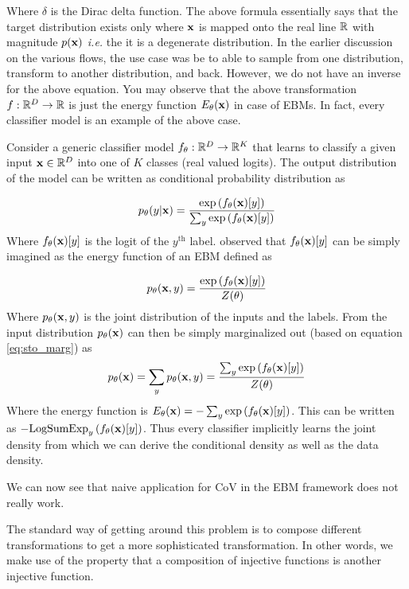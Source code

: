 \documentclass[a4paper, 11pt]{article}
\begin{document}
Where $\delta$ is the Dirac delta function. The above formula essentially says that the target distribution exists only where $\mbox{$\mbox{$\mathbf{x}$}$}$ is mapped onto the real line $\mathbb{R}$ with magnitude $p(\mbox{$\mbox{$\mathbf{x}$}$})$ \textit{i.e.} the it is a degenerate distribution. In the earlier discussion on the various flows, the use case was be to able to sample from one distribution, transform to another distribution, and back. However, we do not have an inverse for the above equation.
You may observe that the above transformation $f: \mathbb{R}^D \to \mathbb{R}$ is just the energy function $E_\theta(\mbox{$\mbox{$\mathbf{x}$}$})$ in case of EBMs. In fact, every classifier model is an example of the above case.

Consider a generic classifier model $f_\theta: \mathbb{R}^D \to \mathbb{R}^K$ that learns to classify a given input $\mbox{$\mbox{$\mathbf{x}$}$} \in \mathbb{R}^D$ into one of $K$ classes (real valued logits). The output distribution of the model can be written as conditional probability distribution as

\begin{align}
    p_\theta(y | \mbox{$\mbox{$\mathbf{x}$}$}) = \frac{\exp\left (f_\theta(\mbox{$\mbox{$\mathbf{x}$}$})[y]  \right )}{\sum_y \exp\left (f_\theta(\mbox{$\mbox{$\mathbf{x}$}$})[y]  \right )}
\end{align}
Where $f_\theta(\mbox{$\mbox{$\mathbf{x}$}$})[y]$ is the logit of the $y^{\text{th}}$ label. \cite{grathwohl2019your} observed that $f_\theta(\mbox{$\mbox{$\mathbf{x}$}$})[y]$ can be simply imagined as the energy function of an EBM defined as

\begin{align}
    p_\theta(\mbox{$\mbox{$\mathbf{x}$}$} , y) = \frac{\exp\left (f_\theta(\mbox{$\mbox{$\mathbf{x}$}$})[y]  \right )}{Z(\theta)}
\end{align}
Where $p_\theta(\mbox{$\mbox{$\mathbf{x}$}$} , y)$ is the joint distribution of the inputs and the labels. From the input distribution $p_\theta(\mbox{$\mbox{$\mathbf{x}$}$})$ can then be simply marginalized out (based on equation \eqref{eq:sto_marg}) as
\begin{align}
    p_\theta(\mbox{$\mbox{$\mathbf{x}$}$}) = \sum_y p_\theta(\mbox{$\mbox{$\mathbf{x}$}$} , y) = \frac{\sum_y\exp\left (f_\theta(\mbox{$\mbox{$\mathbf{x}$}$})[y]  \right )}{Z(\theta)}
\end{align}
Where the energy function is $E_\theta(\mbox{$\mbox{$\mathbf{x}$}$}) = - \sum_y\exp\left (f_\theta(\mbox{$\mbox{$\mathbf{x}$}$})[y]  \right )$. This can be written as $-\text{LogSumExp}_y \left (f_\theta(\mbox{$\mbox{$\mathbf{x}$}$})[y]  \right )$. Thus every classifier implicitly learns  the joint density from which we can derive the conditional density as well as the data density.

We can now see that naive application for CoV in the EBM framework does not really work.

The standard way of getting around this problem is to compose different transformations to get a more sophisticated transformation. In other words, we make use of the property that a composition of injective functions is another injective function. 
\end{document}
